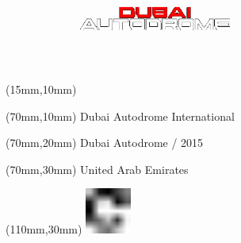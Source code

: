\null\newpage
\begin{textblock*}{50mm}(15mm,10mm)%
\includegraphics[width=50mm]{LG/DUB.png}
\end{textblock*}
\begin{textblock*}{130mm}(70mm,10mm)%
{\fontsize{20}{20}\selectfont Dubai Autodrome International}\\
\end{textblock*}
\begin{textblock*}{120mm}(70mm,20mm)%
{\fontsize{16}{16}\selectfont Dubai Autodrome / 2015}\\
\end{textblock*}
\begin{textblock*}{120mm}(70mm,30mm)%
{\fontsize{12}{12}\selectfont United Arab Emirates}
\end{textblock*}
\begin{textblock*}{30mm}(110mm,30mm)%
\centering
\includegraphics[height=15mm]{icons/fa-rotate-right.pdf}
\end{textblock*}

